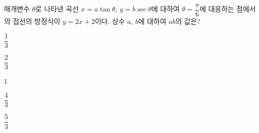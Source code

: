매개변수 $\theta$로 나타낸 곡선 $x=a\tan\theta$, $y=b\sec\theta$에 대하여 $\theta=\dfrac{\pi}{6}$에 대응하는 점에서의 접선의 방정식이 $y=2x+2$이다. 상수 $a$, $b$에 대하여 $ab$의 값은?
\begin{choices32}{\rule[-3ex]{0pt}{8ex}$\dfrac{1}{3}$}{\rule[-3ex]{0pt}{8ex}$\dfrac{2}{3}$}{\rule[-3ex]{0pt}{8ex}$1$}{\rule[-3ex]{0pt}{8ex}$\dfrac{4}{3}$}{\rule[-3ex]{0pt}{8ex}$\dfrac{5}{3}$}\end{choices32}
